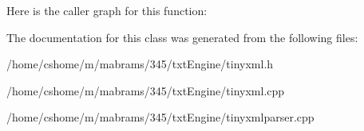 \-Here is the caller graph for this function\-:




\-The documentation for this class was generated from the following files\-:\begin{DoxyCompactItemize}
\item 
/home/cshome/m/mabrams/345/txt\-Engine/tinyxml.\-h\item 
/home/cshome/m/mabrams/345/txt\-Engine/tinyxml.\-cpp\item 
/home/cshome/m/mabrams/345/txt\-Engine/tinyxmlparser.\-cpp\end{DoxyCompactItemize}
